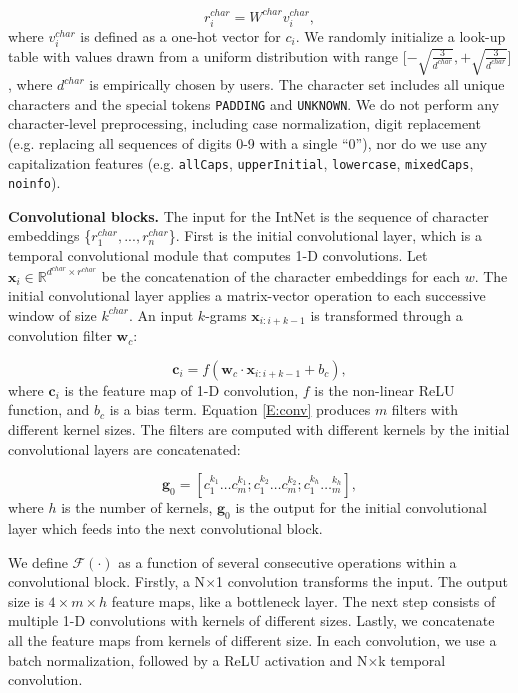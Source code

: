 \documentclass[11pt,a4paper]{article}
\begin{document}
\begin{equation}
r^{char}_i = W^{char} v^{char}_i,
\label{E:char_emb}
\end{equation}
where $v^{char}_i$ is defined as a one-hot vector for $c_i$. We randomly initialize a look-up table with values drawn from a uniform distribution with range $\lbrack -\sqrt{\frac{3}{d^{char}}}, +\sqrt{\frac{3}{d^{char}}} \rbrack$, where $d^{char}$ is empirically chosen by users. The character set includes all unique characters and the special tokens {\tt PADDING} and {\tt UNKNOWN}. We do not perform any character-level preprocessing, including case normalization, digit replacement (e.g. replacing all sequences of digits 0-9 with a single ``0''), nor do we use any capitalization features (e.g. {\tt allCaps}, {\tt upperInitial}, {\tt lowercase}, {\tt mixedCaps}, {\tt noinfo}).

\textbf{Convolutional blocks.} The input for the IntNet is the sequence of character embeddings \{$r^{char}_1, . . . , r^{char}_n$\}. First is the initial convolutional layer, which is a temporal convolutional module that computes 1-D convolutions. Let $\textbf{x}_{i} \in \mathbb{R}^{d^{char} \times r^{char}}$ be the concatenation of the character embeddings for each $w$. The initial convolutional layer applies a matrix-vector operation to each successive window of size $k^{char}$. An input $k$-grams $\textbf{x}_{i:i+k-1}$ is transformed through a convolution filter $\textbf{w}_{c}$:

\begin{equation}
\textbf{c}_{i} = f(\textbf{w}_c \cdot \textbf{x}_{i:i+k-1} + b_c),
\label{E:conv}
\end{equation}
where $\textbf{c}_i$ is the feature map of 1-D convolution,  $f$ is the non-linear ReLU function, and $b_c$ is a bias term. Equation \ref{E:conv} produces $m$ filters with different kernel sizes. The filters are computed with different kernels by the initial convolutional layers are concatenated: 

\begin{equation}
\textbf{g}_{0} = [c^{k_1}_1\dots c^{k_1}_m; c^{k_2}_1\dots c^{k_2}_m; c^{k_h}_1\dotsc^{k_h}_m],
\label{E:concat-feature}
\end{equation}
where $h$ is the number of kernels, $\textbf{g}_{0}$ is the output for the initial convolutional layer which feeds into the next convolutional block. 

We define $\mathcal{F}(\cdot)$ as a function of several consecutive operations within a convolutional block. Firstly, a N$\times$1 convolution transforms the input. The output size is ${4}\times{m}\times{h}$ feature maps, like a bottleneck layer. The next step consists of multiple 1-D convolutions with kernels of different sizes. Lastly, we concatenate all the feature maps from kernels of different size. In each convolution, we use a batch normalization, followed by a ReLU activation and N$\times$k temporal convolution.
\end{document}
